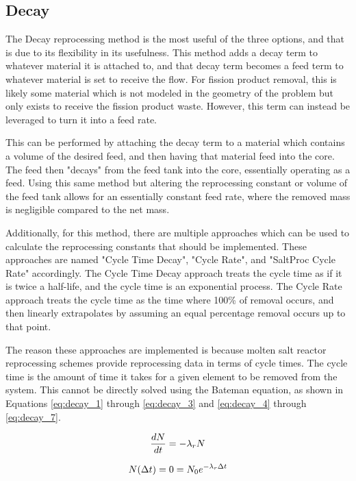 \subsection{Decay}
The Decay reprocessing method is the most useful of the three options, and that is due to its flexibility in its usefulness. This method adds a decay term to whatever material it is attached to, and that decay term becomes a feed term to whatever material is set to receive the flow. For fission product removal, this is likely some material which is not modeled in the geometry of the problem but only exists to receive the fission product waste. However, this term can instead be leveraged to turn it into a feed rate.

This can be performed by attaching the decay term to a material which contains a volume of the desired feed, and then having that material feed into the core. The feed then "decays" from the feed tank into the core, essentially operating as a feed. Using this same method but altering the reprocessing constant or volume of the feed tank allows for an essentially constant feed rate, where the removed mass is negligible compared to the net mass.

Additionally, for this method, there are multiple approaches which can be used to calculate the reprocessing constants that should be implemented. These approaches are named "Cycle Time Decay", "Cycle Rate", and "SaltProc Cycle Rate" accordingly. The Cycle Time Decay approach treats the cycle time as if it is twice a half-life, and the cycle time is an exponential process. The Cycle Rate approach treats the cycle time as the time where 100\% of removal occurs, and then linearly extrapolates by assuming an equal percentage removal occurs up to that point.

The reason these approaches are implemented is because molten salt reactor reprocessing schemes provide reprocessing data in terms of cycle times. The cycle time is the amount of time it takes for a given element to be removed from the system. This cannot be directly solved using the Bateman equation, as shown in Equations \eqref{eq:decay_1} through \eqref{eq:decay_3} and \eqref{eq:decay_4} through \eqref{eq:decay_7}. 

\begin{equation} \hfill
\frac{dN}{dt} = -\lambda_r N
\hfill\label{eq:decay_1} \end{equation}

\begin{equation} \hfill
N(\Delta t) = 0 = N_0 e^{-\lambda_r \Delta t}
\hfill\label{eq:decay_2} \end{equation}

